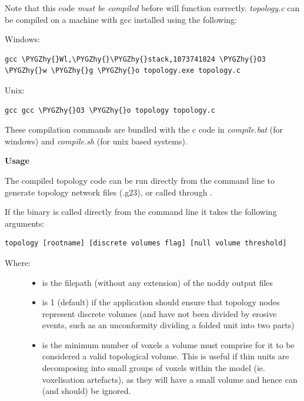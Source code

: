 \documentclass[a4paper,10pt,english]{sphinxmanual}
\def\PYGZhy{\char`\-}
\begin{document}
Note that this code \emph{must be compiled} before 
will function correctly. \emph{topology.c} can be compiled on a machine with gcc installed
using the following:

Windows:

\begin{Verbatim}[commandchars=\\\{\}]
gcc \PYGZhy{}Wl,\PYGZhy{}\PYGZhy{}stack,1073741824 \PYGZhy{}O3 \PYGZhy{}w \PYGZhy{}g \PYGZhy{}o topology.exe topology.c
\end{Verbatim}

Unix:

\begin{Verbatim}[commandchars=\\\{\}]
gcc gcc \PYGZhy{}O3 \PYGZhy{}o topology topology.c
\end{Verbatim}

These compilation commands are bundled with the c code in \emph{compile.bat} (for windows) and
\emph{compile.sh} (for unix based systems).

\textbf{Usage}

The compiled topology code can be run directly from the command line to generate topology
network files (.g23), or called through .

If the binary is called directly from the command line it takes the following arguments:

\begin{Verbatim}[commandchars=\\\{\}]
topology [rootname] [discrete volumes flag] [null volume threshold]
\end{Verbatim}
\begin{description}
\item[{Where:}] \leavevmode\begin{itemize}
\item {} 
 is the filepath (without any extension) of the noddy output files

\item {} 
 is 1 (default) if the application should ensure that topology
nodes represent discrete volumes (and have not been divided by erosive events, such as an
unconformity dividing a folded unit into two parts)

\item {} 
 is the minimum number of voxels a volume must comprise for it to
be considered a valid topological volume. This is useful if thin units are decomposing into
small groups of voxels within the model (ie. voxelisation artefacts), as they will have a
small volume and hence can (and should) be ignored.

\end{itemize}

\end{description}
\end{document}
